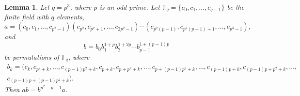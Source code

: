 \documentclass[11pt]{amsart}
\theoremstyle{plain}
\newtheorem{lem}[thm]{Lemma}
\numberwithin{equation}{section}
\def\F{{\mathbb F}}
\begin{document}
 \begin{lem}\label{RR1}
 Let $q=p^3$, where $p$ is an odd prime. Let $\F_q = \{ c_0, c_1, \ldots, c_{q-1}\}$ be the finite field with $q$ elements,
\[
a=(c_{0},c_{1},\ldots,c_{p^2-1})(c_{p^2},c_{p^2+1},\ldots,c_{2p^2-1})\cdots (c_{p^2(p-1)},c_{p^2(p-1)+1},\ldots,c_{p^3-1}), 
\]
 and 
\[
b=b_{0}b_{1}^{1+p}b_2^{1+2p}\cdots b_{p-1}^{1+(p-1)p}
\]
be permutations of $\F_q$, where 
\begin{equation*}
\begin{split}
b_{k}=(c_{k},c_{p^2+k},\ldots,c_{(p-1)p^2+k},c_{p+k},c_{p+p^2+k},\ldots,c_{p+(p-1)p^2+k},\ldots,c_{(p-1)p+k},c_{(p-1)p+p^2+k},\ldots,& \\ c_{(p-1)p+(p-1)p^2+k}). 
\end{split}
\end{equation*}
Then $ab=b^{p^2-p+1}a$.
 \end{lem}
\end{document}
